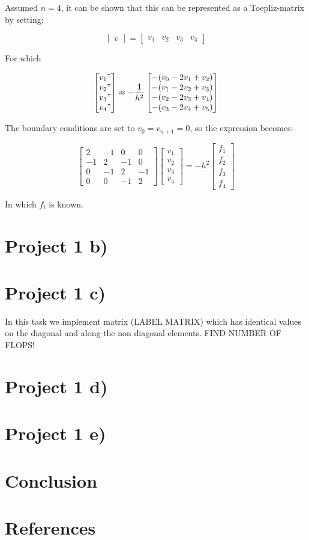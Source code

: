 \documentclass{article}
\begin{document}
Assumed $n= 4$, it can be shown that this can be represented as a Toepliz-matrix by setting: 

\[
\begin{bmatrix}
	v
\end{bmatrix}
=
\begin{bmatrix}
	 v_1 & v_2 & v_3 & v_4
\end{bmatrix}
\]

For which 

\[
\begin{bmatrix}
	v_1" \\  v_2" \\ v_3" \\ v_4"
\end{bmatrix}
	\approx -\frac{1}{h^2}
\begin{bmatrix}
	-(v_{0} -2v_1 +v_2) \\
	-(v_1 -2v_2 +v_3) \\
	-(v_{2} -2v_3 +v_4) \\
	-(v_{3} -2v_4 +v_5) 
\end{bmatrix}
\]

The boundary conditions are set to $v_0 = v_{n+1} = 0$, so the expression becomes: 

\[
\begin{bmatrix}
	2 & -1 & 0 & 0 \\
	-1 & 2 & -1 & 0 \\
	0 & -1 & 2 & -1 \\
	0 & 0 & -1 & 2
\end{bmatrix}
\begin{bmatrix}
	v_1 \\  v_2 \\ v_3 \\ v_4
\end{bmatrix}
	= -h^2
\begin{bmatrix}
	f_1 \\
	f_2 \\
	f_3 \\
	f_4
\end{bmatrix}
\]

In which $f_i$ is known. 

\section{Project 1 b)}

\section{Project 1 c)}
In this task we implement matrix (LABEL MATRIX) which has identical values on the diagonal and along the non diagonal elements. FIND NUMBER OF FLOPS! 

\section{Project 1 d)}

\section{Project 1 e)}


\section{Conclusion}

\section{References}
\end{document}
